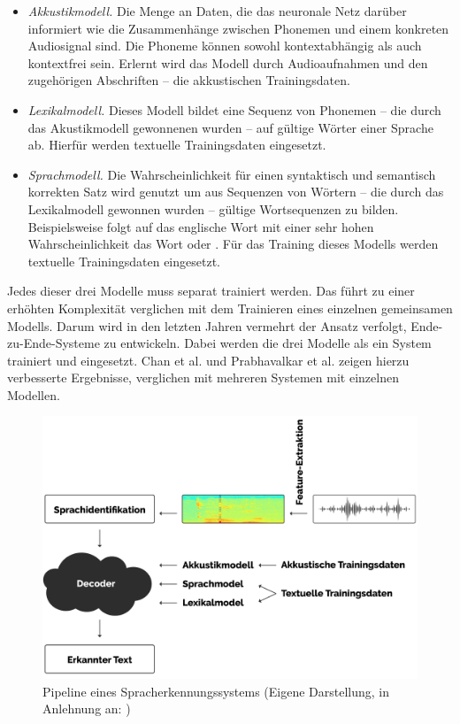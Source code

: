\begin{itemize}
    \item \textit{Akkustikmodell.} Die Menge an Daten, die das neuronale Netz darüber informiert wie die Zusammenhänge zwischen Phonemen und einem konkreten Audiosignal sind. Die Phoneme können
    sowohl kontextabhängig als auch kontextfrei sein.
    Erlernt wird das Modell durch Audioaufnahmen und den zugehörigen Abschriften – die akkustischen Trainingsdaten.
    \item \textit{Lexikalmodell.} Dieses Modell bildet eine Sequenz von Phonemen – die durch das Akustikmodell gewonnenen wurden – auf gültige Wörter einer Sprache ab. Hierfür werden textuelle Trainingsdaten eingesetzt.
    \item \textit{Sprachmodell.} Die Wahrscheinlichkeit für einen syntaktisch und semantisch korrekten Satz wird genutzt um aus Sequenzen von Wörtern – die durch das Lexikalmodell gewonnen wurden – gültige Wortsequenzen zu bilden.
    Beispielsweise folgt auf das englische Wort \grqq{} mit einer sehr hohen Wahrscheinlichkeit das Wort \grqq{} oder
    \grqq{}. Für das Training dieses Modells werden textuelle Trainingsdaten eingesetzt.
\end{itemize}

Jedes dieser drei Modelle muss separat trainiert werden. Das führt zu einer erhöhten Komplexität verglichen mit dem Trainieren eines einzelnen gemeinsamen Modells.
Darum wird in den letzten Jahren vermehrt der Ansatz verfolgt, Ende-zu-Ende-Systeme zu entwickeln. Dabei werden die drei Modelle als ein System trainiert und eingesetzt.
Chan et al. \cite{Chan.2015} und Prabhavalkar et al. \cite{Prabhavalkar.2017} zeigen hierzu verbesserte Ergebnisse, verglichen mit mehreren Systemen mit einzelnen Modellen.

\begin{figure}[h!]
    \centering
    \includegraphics[width=1\linewidth]{images/pipeline}
    \caption{Pipeline eines Spracherkennungssystems (Eigene Darstellung, in Anlehnung an: \cite{Tom.2016}) }%
    \label{fig:pipeline}
\end{figure}